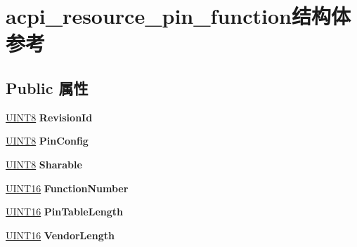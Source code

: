 \hypertarget{structacpi__resource__pin__function}{}\section{acpi\+\_\+resource\+\_\+pin\+\_\+function结构体 参考}
\label{structacpi__resource__pin__function}
\subsection*{Public 属性}
\begin{DoxyCompactItemize}
\item 
\mbox{\label{structacpi__resource__pin__function_a84bd83ee179fb3da914b2c9b33a85254}} 
\hyperlink{_processor_bind_8h_ab27e9918b538ce9d8ca692479b375b6a}{U\+I\+N\+T8} {\bfseries Revision\+Id}
\item 
\mbox{\label{structacpi__resource__pin__function_a79143ab0702cbab7e3a6a8659e46fd9a}} 
\hyperlink{_processor_bind_8h_ab27e9918b538ce9d8ca692479b375b6a}{U\+I\+N\+T8} {\bfseries Pin\+Config}
\item 
\mbox{\label{structacpi__resource__pin__function_a50dfe5b1b117a75bb8050f0c5321cf96}} 
\hyperlink{_processor_bind_8h_ab27e9918b538ce9d8ca692479b375b6a}{U\+I\+N\+T8} {\bfseries Sharable}
\item 
\mbox{\label{structacpi__resource__pin__function_a3180dfa4e817ec79b74639486b063f4b}} 
\hyperlink{_processor_bind_8h_a09f1a1fb2293e33483cc8d44aefb1eb1}{U\+I\+N\+T16} {\bfseries Function\+Number}
\item 
\mbox{\label{structacpi__resource__pin__function_abf195cb876f689ca11a6d898e2d8c276}} 
\hyperlink{_processor_bind_8h_a09f1a1fb2293e33483cc8d44aefb1eb1}{U\+I\+N\+T16} {\bfseries Pin\+Table\+Length}
\item 
\mbox{\label{structacpi__resource__pin__function_a3f0b357888692e0b80bae73c1618cb87}} 
\hyperlink{_processor_bind_8h_a09f1a1fb2293e33483cc8d44aefb1eb1}{U\+I\+N\+T16} {\bfseries Vendor\+Length}
\item 

\end{DoxyCompactItemize}

